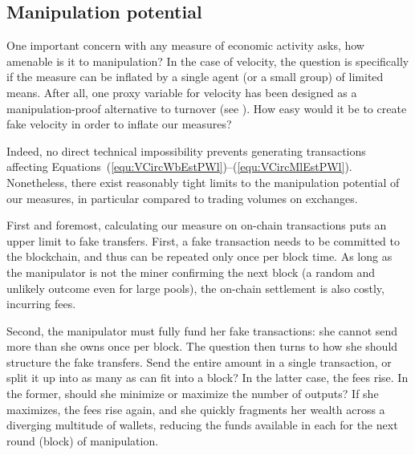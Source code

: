 


\subsection{Manipulation potential}
\label{sec:cc_money_seg:manipul}%

One important concern with any measure of economic activity asks, how
amenable is it to manipulation?  In the case of velocity, the question is
specifically if the measure can be inflated by a single agent (or a small
group) of limited means.  After all, one proxy variable for velocity has been
designed as a manipulation-proof alternative to turnover (see
).  How easy would it be to
create fake velocity in order to inflate our measures?

Indeed, no direct technical impossibility prevents generating transactions
affecting Equations~(\ref{equ:VCircWbEstPWl})--(\ref{equ:VCircMlEstPWl}).
Nonetheless, there exist reasonably tight limits to the manipulation
potential of our measures, in particular compared to trading volumes on
exchanges.

First and foremost, calculating our measure on on-chain transactions puts an upper
limit to fake transfers.  First, a fake transaction needs to be committed to
the blockchain, and thus can be repeated only once per block time.  As long
as the manipulator is not the miner confirming the next block (a random and
unlikely outcome even for large pools), the on-chain settlement is also
costly, incurring fees.

Second, the manipulator must fully fund her fake transactions: she cannot
send more than she owns once per block.  The question then turns to how she
should structure the fake transfers.  Send the entire amount in a single
transaction, or split it up into as many as can fit into a block?  In the
latter case, the fees rise.  In the former, should she minimize or maximize
the number of outputs?  If she maximizes, the fees rise again, and she
quickly fragments her wealth across a diverging multitude of wallets,
reducing the funds available in each for the next round (block) of
manipulation.

